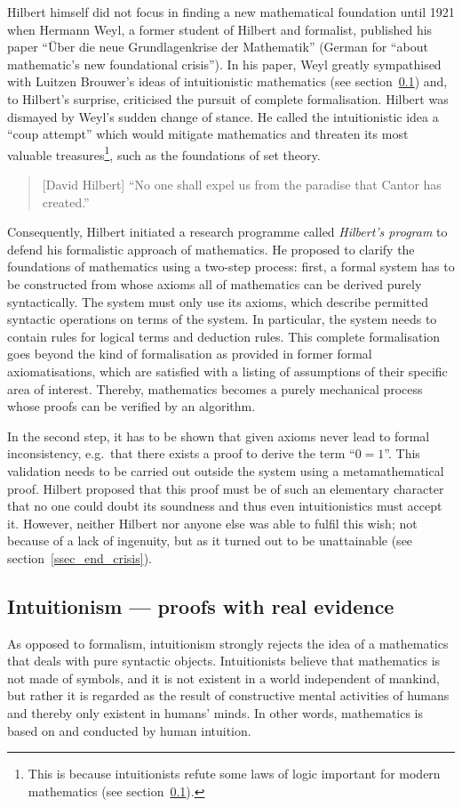 \documentclass[hidelinks]{article}
\begin{document}
Hilbert himself did not focus in finding a new mathematical foundation until 1921 when Hermann Weyl, a former student of Hilbert and formalist, published his paper ``Über die neue Grundlagenkrise der Mathematik'' (German for ``about mathematic's new foundational crisis''). In his paper, Weyl greatly sympathised with Luitzen Brouwer's ideas of intuitionistic mathematics (see section~\ref{ssec_intuitionism}) and, to Hilbert's surprise, criticised the pursuit of complete formalisation. Hilbert was dismayed by Weyl's sudden change of stance. He called the intuitionistic idea a ``coup attempt'' which would mitigate mathematics and threaten its most valuable treasures\footnote{This is because intuitionists refute some laws of logic important for modern mathematics (see section~\ref{ssec_intuitionism}).}, such as the foundations of set theory.\cite{hilbert_coup}
\begin{quote}[David Hilbert]
``No one shall expel us from the paradise that Cantor has created.''\cite{hilbert_paradise}
\end{quote}
Consequently, Hilbert initiated a research programme called \textit{Hilbert's program} to defend his formalistic approach of mathematics. He proposed to clarify the foundations of mathematics using a two-step process: first, a formal system has to be constructed from whose axioms all of mathematics can be derived purely syntactically. The system must only use its axioms, which describe permitted syntactic operations on terms of the system. In particular, the system needs to contain rules for logical terms and deduction rules. This complete formalisation goes beyond the kind of formalisation as provided in former formal axiomatisations, which are satisfied with a listing of assumptions of their specific area of interest. Thereby, mathematics becomes a purely mechanical process whose proofs can be verified by an algorithm.

In the second step, it has to be shown that given axioms never lead to formal inconsistency, e.g.\ that there exists a proof to derive the term ``$0=1$''. This validation needs to be carried out outside the system using a metamathematical proof. Hilbert proposed that this proof must be of such an elementary character that no one could doubt its soundness and thus even intuitionistics must accept it. However, neither Hilbert nor anyone else was able to fulfil this wish; not because of a lack of ingenuity, but as it turned out to be unattainable (see section~\ref{ssec_end_crisis}).

\subsection{Intuitionism --- proofs with real evidence}\label{ssec_intuitionism}
As opposed to formalism, intuitionism strongly rejects the idea of a mathematics that deals with pure syntactic objects. Intuitionists believe that mathematics is not made of symbols, and it is not existent in a world independent of mankind, but rather it is regarded as the result of constructive mental activities of humans and thereby only existent in humans' minds. In other words, mathematics is based on and conducted by human intuition.
\end{document}
